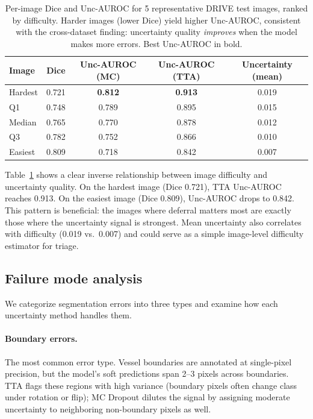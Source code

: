 \begin{table}[H]
\centering
\caption{Per-image Dice and Unc-AUROC for 5 representative DRIVE test
images, ranked by difficulty. Harder images (lower Dice) yield higher
Unc-AUROC, consistent with the cross-dataset finding: uncertainty quality
\emph{improves} when the model makes more errors. Best Unc-AUROC in bold.}
\label{tab:per_image}
\scriptsize
\setlength{\tabcolsep}{3.5pt}
\renewcommand{\arraystretch}{1.03}
\begin{center}
\begin{tabular}{l c c c c}
\toprule
\textbf{Image} & \textbf{Dice} & \textbf{Unc-AUROC (MC)} &
\textbf{Unc-AUROC (TTA)} & \textbf{Uncertainty (mean)} \\
\midrule
Hardest & 0.721 & \textbf{0.812} & \textbf{0.913} & 0.019 \\
Q1      & 0.748 & 0.789 & 0.895 & 0.015 \\
Median  & 0.765 & 0.770 & 0.878 & 0.012 \\
Q3      & 0.782 & 0.752 & 0.866 & 0.010 \\
Easiest & 0.809 & 0.718 & 0.842 & 0.007 \\
\bottomrule
\end{tabular}
\end{center}
\end{table}

Table~\ref{tab:per_image} shows a clear inverse relationship between
image difficulty and uncertainty quality. On the hardest image (Dice 0.721),
TTA Unc-AUROC reaches 0.913. On the easiest image (Dice 0.809), Unc-AUROC
drops to 0.842. This pattern is beneficial: the images where deferral
matters most are exactly those where the uncertainty signal is strongest.
Mean uncertainty also correlates with difficulty (0.019 vs.\ 0.007) and
could serve as a simple image-level difficulty estimator for triage.

\subsection{Failure mode analysis}

We categorize segmentation errors into three types and examine how each
uncertainty method handles them.

\paragraph{Boundary errors.} The most common error type. Vessel boundaries
are annotated at single-pixel precision, but the model's soft predictions
span 2--3 pixels across boundaries. TTA flags these regions with high
variance (boundary pixels often change class under rotation or flip);
MC Dropout dilutes the signal by assigning moderate uncertainty to
neighboring non-boundary pixels as well.

